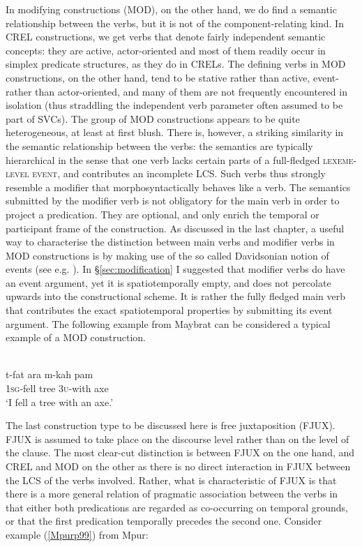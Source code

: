 In modifying constructions (MOD), on the other hand, we do find a semantic relationship between the verbs, but it is not of the component-relating kind. In CREL constructions, we get verbs that denote fairly independent semantic concepts: they are active, actor-oriented and most of them readily occur in simplex predicate structures, as they do in CRELs. The defining verbs in MOD constructions, on the other hand, tend to be stative rather than active, event- rather than actor-oriented, and many of them are not frequently encountered in isolation (thus straddling the independent verb parameter often assumed to be part of SVCs). The group of MOD constructions appears to be quite heterogeneous, at least at first blush. There is, however, a striking similarity in the semantic relationship between the verbs: the semantics are typically hierarchical in the sense that one verb lacks certain parts of a full-fledged \textsc{lexeme-level event}, and contributes an incomplete LCS. Such verbs thus strongly resemble a modifier that morphosyntactically behaves like a verb. The semantics submitted by the modifier verb is not obligatory for the main verb in order to project a predication. They are optional, and only enrich the temporal or participant frame of the construction. As discussed in the last chapter, a useful way to characterise the distinction between main verbs and modifier verbs in MOD constructions is by making use of the so called Davidsonian notion of events (see e.g. \citealt{maienborn2011event}). In §\ref{sec:modification} I suggested that modifier verbs do have an event argument, yet it is spatiotemporally empty, and does not percolate upwards into the constructional scheme. It is rather the fully fledged main verb that contributes the exact spatiotemporal properties by submitting its event argument. The following example from Maybrat can be considered a typical example of a MOD construction. 

\ea 
{}\\
\gll t-fat ara m-kah pam \\
1\textsc{sg}-fell tree 3\textsc{u}-with axe \\
\glft `I fell a tree with an axe.'\\ 
\z

The last construction type to be discussed here is free juxtaposition (FJUX). FJUX is assumed to take place on the discourse level rather than on the level of the clause. The most clear-cut distinction is between FJUX on the one hand, and CREL and MOD on the other as there is no direct interaction in FJUX between the LCS of the verbs involved. Rather, what is characteristic of FJUX is that there is a more general relation of pragmatic association between the verbs in that either both predications are regarded as co-occurring on temporal grounds, or that the first predication temporally precedes the second one. Consider example (\ref{Mpurp99}) from Mpur:

